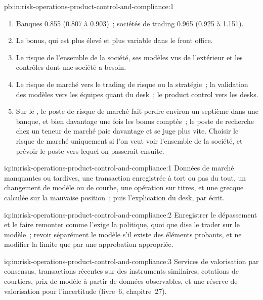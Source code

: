 \begin{solution}{pb:in:risk-operations-product-control-and-compliance:1}
\begin{enumerate}
\item Banques 0.855 (0.807 à 0.903)~; sociétés de trading 0.965 (0.925 à 1.151).
\item Le bonus, qui est plus élevé et plus variable dans le front office.
\item Le risque de l'ensemble de la société, ses modèles vus de l'extérieur et les contrôles dont une société a besoin.
\item Le risque de marché vers le trading de risque ou la stratégie~; la validation des modèles vers les équipes quant du desk~; le product control vers les desks.
\item Sur le , le poste de risque de marché fait perdre environ un septième dans une banque, et bien davantage une fois les bonus comptés~; le
poste de recherche chez un teneur de marché paie davantage et se juge plus vite. Choisir le risque de marché uniquement si l'on veut voir l'ensemble de la société, et
prévoir le poste vers lequel on passerait ensuite.
\end{enumerate}
\end{solution}

\begin{solution}{iq:in:risk-operations-product-control-and-compliance:1}
Données de marché manquantes ou tardives, une transaction enregistrée à tort ou pas du tout, un changement de modèle ou de courbe, une opération sur titres, et une
grecque calculée sur la mauvaise position~; puis l'explication du desk, par écrit.
\end{solution}

\begin{solution}{iq:in:risk-operations-product-control-and-compliance:2}
Enregistrer le dépassement et le faire remonter comme l'exige la politique, quoi que dise le trader sur le modèle~; revoir séparément le
modèle s'il existe des éléments probants, et ne modifier la limite que par une approbation appropriée.
\end{solution}

\begin{solution}{iq:in:risk-operations-product-control-and-compliance:3}
Services de valorisation par consensus, transactions récentes sur des instruments similaires, cotations de courtiers, prix de modèle à partir de données observables,
et une réserve de valorisation pour l'incertitude (livre~6, chapitre~27).
\end{solution}

